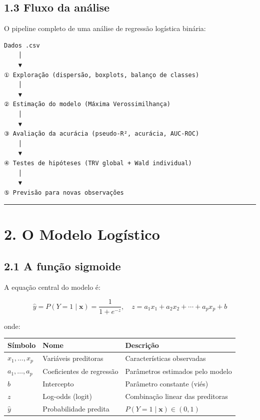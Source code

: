 \documentclass[
  letterpaper,
  DIV=11,
  numbers=noendperiod]{scrartcl}
\newcounter{none} %
\begin{document}
\subsection{1.3 Fluxo da análise}\label{fluxo-da-anuxe1lise}

O pipeline completo de uma análise de regressão logística binária:

\begin{verbatim}
Dados .csv
    │
    ▼
① Exploração (dispersão, boxplots, balanço de classes)
    │
    ▼
② Estimação do modelo (Máxima Verossimilhança)
    │
    ▼
③ Avaliação da acurácia (pseudo-R², acurácia, AUC-ROC)
    │
    ▼
④ Testes de hipóteses (TRV global + Wald individual)
    │
    ▼
⑤ Previsão para novas observações
\end{verbatim}

\begin{center}\rule{0.5\linewidth}{0.5pt}\end{center}

\section{2. O Modelo Logístico}\label{o-modelo-loguxedstico}

\subsection{2.1 A função sigmoide}\label{a-funuxe7uxe3o-sigmoide}

A equação central do modelo é:

\[\hat{y} = P(Y = 1 \mid \mathbf{x}) = \frac{1}{1 + e^{-z}}, \quad z = a_1 x_1 + a_2 x_2 + \cdots + a_p x_p + b\]

onde:

{\def\LTcaptype{none} %
\begin{longtable}[]{@{}
  >{\centering\arraybackslash}p{}
  >{\raggedright\arraybackslash}p{}
  >{\raggedright\arraybackslash}p{}@{}}
\toprule\noalign{}
\begin{minipage}[b]{\linewidth}\centering
Símbolo
\end{minipage} & \begin{minipage}[b]{\linewidth}\raggedright
Nome
\end{minipage} & \begin{minipage}[b]{\linewidth}\raggedright
Descrição
\end{minipage} \\
\midrule\noalign{}
\endhead
\bottomrule\noalign{}
\endlastfoot
\(x_1, \ldots, x_p\) & Variáveis preditoras & Características
observadas \\
\(a_1, \ldots, a_p\) & Coeficientes de regressão & Parâmetros estimados
pelo modelo \\
\(b\) & Intercepto & Parâmetro constante (viés) \\
\(z\) & Log-odds (logit) & Combinação linear das preditoras \\
\(\hat{y}\) & Probabilidade predita &
\(P(Y=1 \mid \mathbf{x}) \in (0,1)\) \\
\end{longtable}
}
\end{document}

